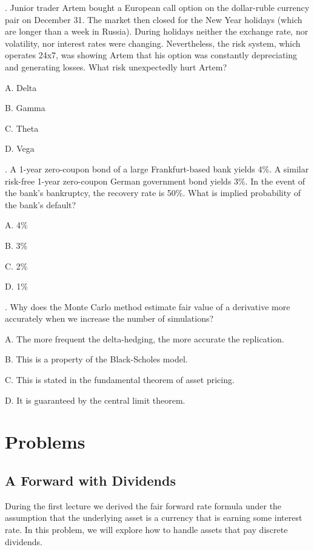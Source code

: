 \documentclass[a4paper,14pt]{extarticle}
\begin{document}
. Junior trader Artem bought a European call option on the dollar-ruble currency pair on December 31. The market then closed for the New Year holidays (which are longer than a week in Russia). During holidays neither the exchange rate, nor volatility, nor interest rates were changing. Nevertheless, the risk system, which operates 24x7, was showing Artem that his option was constantly depreciating and generating losses. What risk unexpectedly hurt Artem?

A. Delta

B. Gamma

C. Theta

D. Vega

\vspace{\baselineskip}

. A 1-year zero-coupon bond of a large Frankfurt-based bank yields 4\%. A similar risk-free 1-year zero-coupon German  government bond yields 3\%. In the event of the bank's bankruptcy, the recovery rate is 50\%. What is implied probability of the bank's default?

A. 4\%

B. 3\%

C. 2\%

D. 1\%

\vspace{\baselineskip}

. Why does the Monte Carlo method estimate fair value of a derivative more accurately when we increase the number of simulations?

A. The more frequent the delta-hedging, the more accurate the replication.

B. This is a property of the Black-Scholes model.

C. This is stated in the fundamental theorem of asset pricing.

D. It is guaranteed by the central limit theorem.

\section{Problems} 

\subsection{A Forward with Dividends}

During the first lecture we derived the fair forward rate formula under the assumption that the underlying asset is a currency that is earning some interest rate. In this problem, we will explore how to handle assets that pay discrete dividends.
\end{document}
